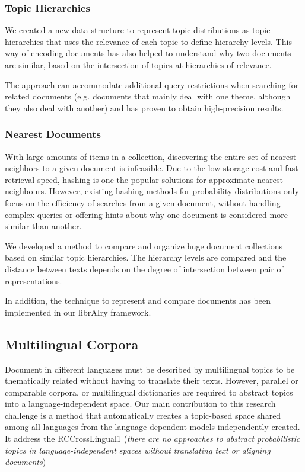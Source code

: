 \subsubsection{Topic Hierarchies}

We created a new data structure to represent topic distributions as topic hierarchies that uses the relevance of each topic to define hierarchy levels. This way of encoding documents has also helped to understand why two documents are similar, based on the intersection of topics at hierarchies of relevance.

The approach can accommodate additional query restrictions when searching for related documents (e.g. documents that mainly deal with one theme, although they also deal with another) and has proven to obtain high-precision results. 

\subsubsection{Nearest Documents}

With large amounts of items in a collection, discovering the entire set of nearest neighbors to a given document is infeasible. Due to the low storage cost and fast retrieval speed, hashing is one the popular solutions for approximate nearest neighbours. However, existing hashing methods for probability distributions only focus on the efficiency of searches from a given document, without handling complex queries or offering hints about why one document is considered more similar than another.

We developed a method to compare and organize huge document collections based on similar topic hierarchies. The hierarchy levels are compared and the distance between texts depends on the degree of intersection between pair of representations.

In addition, the technique to represent and compare documents has been implemented in our librAIry framework.

\subsection{Multilingual Corpora}

Document in different languages must be described by multilingual topics to be thematically related without having to translate their texts. However, parallel or comparable corpora, or multilingual dictionaries are required to abstract topics into a language-independent space. Our main contribution to this research challenge is a method that automatically creates a topic-based space shared among all languages from the language-dependent models independently created. It address the RCCrossLingual1 (\textit{there are no approaches to abstract probabilistic topics in language-independent spaces without translating text or aligning documents}) 

